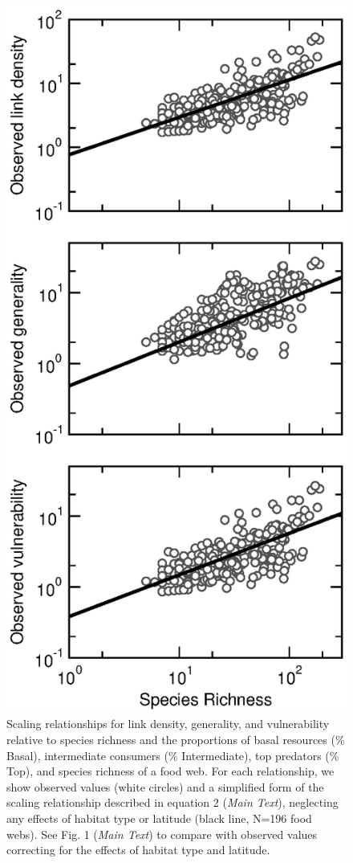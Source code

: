\documentclass[12pt]{article}
\begin{document}
\begin{figure}[!h]
\centerline{\includegraphics*[height=.75\textheight]{Figures/by_TL/scaling_with_S/proportions/S_fitlines_nonts_observed.eps}}
\caption{Scaling relationships for link density, generality, 
and vulnerability relative to species richness and the proportions of basal resources (\% Basal),
intermediate consumers (\% Intermediate), top predators (\% Top), and species richness of a food web. 
For each relationship, we show observed values (white circles) and 
a simplified form of the scaling relationship described in equation 2 (\emph{Main Text}), neglecting 
any effects of habitat type or latitude (black line, N=196 food webs). See Fig. 1 (\emph{Main Text}) to compare with 
observed values correcting for the effects of habitat type and latitude. }
\label{props_v_lat_obs}
\end{figure}
\end{document}
